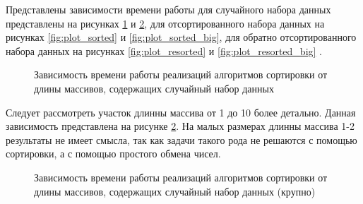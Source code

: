 Представлены зависимости времени работы  для случайного набора данных представлены  на рисунках \ref{fig:plot_random} и \ref{fig:plot_random_big}, для отсортированного набора данных на рисунках \ref{fig:plot_sorted} и \ref{fig:plot_sorted_big}, для обратно отсортированного набора данных на рисунках \ref{fig:plot_resorted} и \ref{fig:plot_resorted_big} . 
\begin{figure}[H]
    \centering
    

    \caption{Зависимость времени работы реализаций алгоритмов сортировки от длины массивов, содержащих случайный набор данных}
    \label{fig:plot_random}
\end{figure} 

Следует рассмотреть участок длинны массива от 1 до 10 более детально. Данная зависимость представлена на рисунке \ref{fig:plot_random_big}. На малых размерах длинны массива 1-2 результаты не имеет смысла, так как задачи такого рода не решаются с помощью сортировки, а с помощью простого обмена чисел.

\begin{figure}[H]
    \centering
    

    \caption{Зависимость времени работы реализаций алгоритмов сортировки от длины массивов, содержащих случайный набор данных (крупно)}
    \label{fig:plot_random_big}
\end{figure} 

